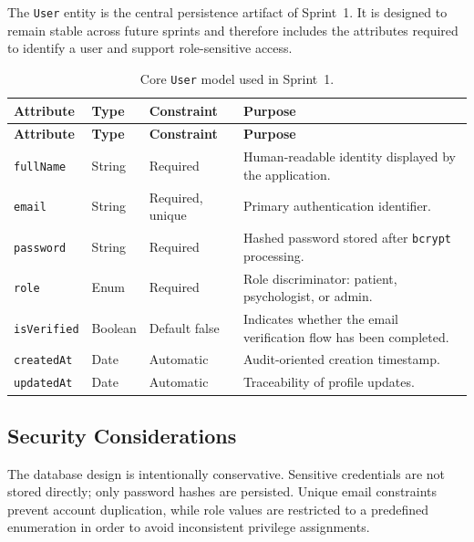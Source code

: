 \documentclass[a4paper,12pt]{report}
\begin{document}
The \texttt{User} entity is the central persistence artifact of Sprint~1. It is designed to remain stable across future sprints and therefore includes the attributes required to identify a user and support role-sensitive access.

\begin{longtable}{@{} L{0.22\textwidth} L{0.16\textwidth} L{0.14\textwidth} L{0.38\textwidth} @{}}
\caption{Core \texttt{User} model used in Sprint~1.}
\label{tab:sprint1-user-model}\\
\toprule
\textbf{Attribute} &
\textbf{Type} &
\textbf{Constraint} &
\textbf{Purpose} \\
\midrule
\endfirsthead

\toprule
\textbf{Attribute} &
\textbf{Type} &
\textbf{Constraint} &
\textbf{Purpose} \\
\midrule
\endhead

\texttt{fullName} & String & Required & Human-readable identity displayed by the application. \\
\midrule
\texttt{email} & String & Required, unique & Primary authentication identifier. \\
\midrule
\texttt{password} & String & Required & Hashed password stored after \texttt{bcrypt} processing. \\
\midrule
\texttt{role} & Enum & Required & Role discriminator: patient, psychologist, or admin. \\
\midrule
\texttt{isVerified} & Boolean & Default false & Indicates whether the email verification flow has been completed. \\
\midrule
\texttt{createdAt} & Date & Automatic & Audit-oriented creation timestamp. \\
\midrule
\texttt{updatedAt} & Date & Automatic & Traceability of profile updates. \\

\bottomrule
\end{longtable}

\subsection{Security Considerations}

The database design is intentionally conservative. Sensitive credentials are not stored directly; only password hashes are persisted. Unique email constraints prevent account duplication, while role values are restricted to a predefined enumeration in order to avoid inconsistent privilege assignments.
\end{document}
